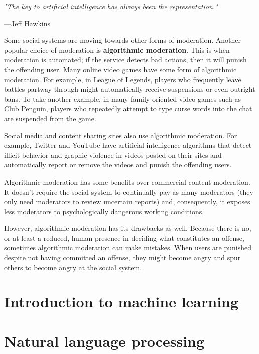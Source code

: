 \documentclass[class=book, crop=false]{standalone}
\providecommand{\keyterm}[1]{\textbf{#1}\marginnote{\scriptsize \textbf{#1}}}
\begin{document}
\epigraph{\itshape "The key to artificial intelligence has always been the representation."}{---Jeff Hawkins}

Some social systems are moving towards other forms of moderation. Another popular choice of moderation is \keyterm{algorithmic moderation}. This is when moderation is automated; if the service detects bad actions, then it will punish the offending user. Many online video games have some form of algorithmic moderation. For example, in League of Legends, players who frequently leave battles partway through might automatically receive suspensions or even outright bans. To take another example, in many family-oriented video games such as Club Penguin, players who repeatedly attempt to type curse words into the chat are suspended from the game.

Social media and content sharing sites also use algorithmic moderation. For example, Twitter and YouTube have artificial intelligence algorithms that detect illicit behavior and graphic violence in videos posted on their sites and automatically report or remove the videos and punish the offending users.

Algorithmic moderation has some benefits over commercial content moderation. It doesn't require the social system to continually pay as many moderators (they only need moderators to review uncertain reports) and, consequently, it exposes less moderators to psychologically dangerous working conditions.

However, algorithmic moderation has its drawbacks as well. Because there is no, or at least a reduced, human presence in deciding what constitutes an offense, sometimes algorithmic moderation can make mistakes. When users are punished despite not having committed an offense, they might become angry and spur others to become angry at the social system.

\section{Introduction to machine learning}

\section{Natural language processing}
\end{document}
